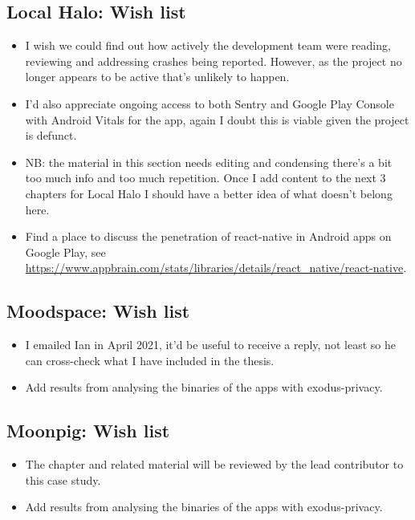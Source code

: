 \subsection*{Local Halo: Wish list}
{\small
\begin{itemize}
    \itemsep0em
    \item I wish we could find out how actively the development team were reading, reviewing and addressing crashes being reported. However, as the project no longer appears to be active that's unlikely to happen.
    \item I'd also appreciate ongoing access to both Sentry and Google Play Console with Android Vitals for the app, again I doubt this is viable given the project is defunct.
    \item NB: the material in this section needs editing and condensing there's a bit too much info and too much repetition. Once I add content to the next 3 chapters for Local Halo I should have a better idea of what doesn't belong here.
    \item Find a place to discuss the penetration of react-native in Android apps on Google Play, see \url{https://www.appbrain.com/stats/libraries/details/react_native/react-native}.
\end{itemize}
}


\subsection*{Moodspace: Wish list}
{\small
\begin{itemize}
    \item I emailed Ian in April 2021, it'd be useful to receive a reply, not least so he can cross-check what I have included in the thesis.
    \item Add results from analysing the binaries of the apps with exodus-privacy.
\end{itemize}
}


\subsection*{Moonpig: Wish list}
{\small
\begin{itemize}
    \item The chapter and related material will be reviewed by the lead contributor to this case study.
    \item Add results from analysing the binaries of the apps with exodus-privacy.
\end{itemize}
}

